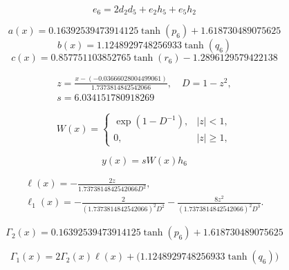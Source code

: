 \begin{equation}
e_{6}=2 d_{2} d_{5} + e_{2} h_{5} + e_{5} h_{2}
\end{equation}


\begin{equation}
a(x)=0.16392539473914125 \tanh{\left(p_{6} \right)} + 1.618730489075625
\end{equation}
\begin{equation}
b(x)=1.1248929748256933 \tanh{\left(q_{6} \right)}
\end{equation}
\begin{equation}
c(x)=0.857751103852765 \tanh{\left(r_{6} \right)} - 1.2896129579422138
\end{equation}


\begin{equation}
\begin{aligned}z=\frac{x-(-0.03666028004499061)}{1.7373814842542066},\quad D=1-z^2,\\s=6.034151780918269\end{aligned}
\end{equation}


\begin{equation}
W(x)=\begin{cases}\exp(1-D^{-1}),&|z|<1,\\0,&|z|\ge1,\end{cases}
\end{equation}


\begin{equation}\label{eq:ex3-solution}
y(x)=sW(x)h_{6}
\end{equation}


\begin{equation}
\begin{aligned}\ell(x)=-\frac{2z}{1.7373814842542066D^2},\\\ell_1(x)=-\frac{2}{(1.7373814842542066)^2D^2}-\frac{8z^2}{(1.7373814842542066)^2D^3}.\end{aligned}
\end{equation}


\begin{equation}
\Gamma_2(x)=0.16392539473914125 \tanh{\left(p_{6} \right)} + 1.618730489075625
\end{equation}


\begin{equation}
\Gamma_1(x)=2\Gamma_2(x)\ell(x)+\bigl(1.1248929748256933 \tanh{\left(q_{6} \right)}\bigr)
\end{equation}


